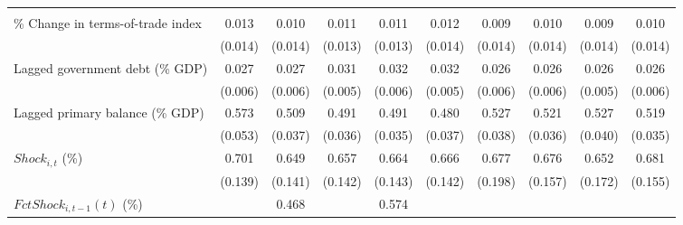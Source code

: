 {\begin{tabular}{l*{9}{c}}
                    &                     &                     &                     &                     &                     &                     &                     &                     &                     \\
\addlinespace
\% Change in terms-of-trade index&       0.013         &       0.010         &       0.011         &       0.011         &       0.012         &       0.009         &       0.010         &       0.009         &       0.010         \\
                    &     (0.014)         &     (0.014)         &     (0.013)         &     (0.013)         &     (0.014)         &     (0.014)         &     (0.014)         &     (0.014)         &     (0.014)         \\
\addlinespace
Lagged government debt (\% GDP)&       0.027\sym{***}&       0.027\sym{***}&       0.031\sym{***}&       0.032\sym{***}&       0.032\sym{***}&       0.026\sym{***}&       0.026\sym{***}&       0.026\sym{***}&       0.026\sym{***}\\
                    &     (0.006)         &     (0.006)         &     (0.005)         &     (0.006)         &     (0.005)         &     (0.006)         &     (0.006)         &     (0.005)         &     (0.006)         \\
\addlinespace
Lagged primary balance (\% GDP)&       0.573\sym{***}&       0.509\sym{***}&       0.491\sym{***}&       0.491\sym{***}&       0.480\sym{***}&       0.527\sym{***}&       0.521\sym{***}&       0.527\sym{***}&       0.519\sym{***}\\
                    &     (0.053)         &     (0.037)         &     (0.036)         &     (0.035)         &     (0.037)         &     (0.038)         &     (0.036)         &     (0.040)         &     (0.035)         \\
\addlinespace
$ Shock_{i,t}$ (\%) &       0.701\sym{***}&       0.649\sym{***}&       0.657\sym{***}&       0.664\sym{***}&       0.666\sym{***}&       0.677\sym{***}&       0.676\sym{***}&       0.652\sym{***}&       0.681\sym{***}\\
                    &     (0.139)         &     (0.141)         &     (0.142)         &     (0.143)         &     (0.142)         &     (0.198)         &     (0.157)         &     (0.172)         &     (0.155)         \\
\addlinespace
$ FctShock_{i,t-1}(t)$ (\%)&                     &       0.468\sym{**} &                     &       0.574\sym{**} &                     &                     &                     &                     &                     \\

\end{tabular}}
